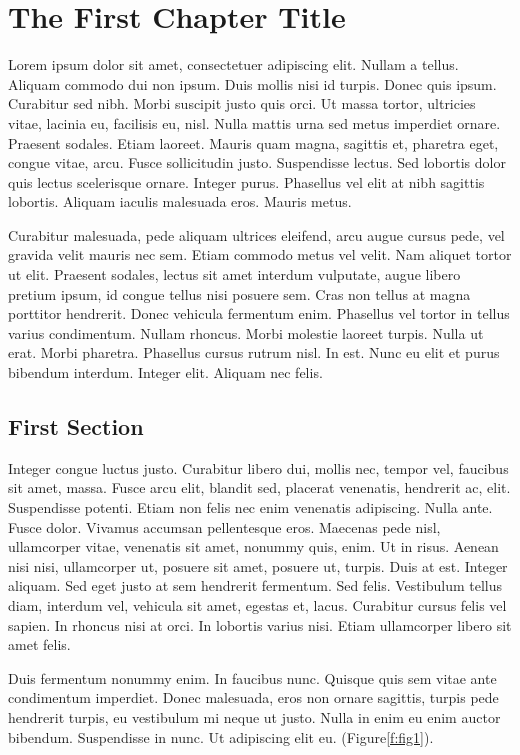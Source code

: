 \chapter{The First Chapter Title}
\label{c:chapter1} Lorem ipsum dolor sit amet, consectetuer adipiscing elit.
Nullam a tellus. Aliquam commodo dui non ipsum. Duis mollis nisi id turpis.
Donec quis ipsum. Curabitur sed nibh. Morbi suscipit justo quis orci. Ut massa
tortor, ultricies vitae, lacinia eu, facilisis eu, nisl. Nulla mattis urna sed
metus imperdiet ornare. Praesent sodales. Etiam laoreet. Mauris quam magna,
sagittis et, pharetra eget, congue vitae, arcu. Fusce sollicitudin justo.
Suspendisse lectus. Sed lobortis dolor quis lectus scelerisque ornare. Integer
purus. Phasellus vel elit at nibh sagittis lobortis. Aliquam iaculis malesuada
eros. Mauris metus.

Curabitur malesuada, pede aliquam ultrices eleifend, arcu augue cursus pede,
vel gravida velit mauris nec sem. Etiam commodo metus vel velit. Nam aliquet
tortor ut elit. Praesent sodales, lectus sit amet interdum vulputate, augue
libero pretium ipsum, id congue tellus nisi posuere sem. Cras non tellus at
magna porttitor hendrerit. Donec vehicula fermentum enim. Phasellus vel tortor
in tellus varius condimentum. Nullam rhoncus. Morbi molestie laoreet turpis.
Nulla ut erat. Morbi pharetra. Phasellus cursus rutrum nisl. In est. Nunc eu
elit et purus bibendum interdum. Integer elit. Aliquam nec felis.

\section{First Section}
\label{st:section1} Integer congue luctus justo. Curabitur libero dui,
mollis nec, tempor vel, faucibus sit amet, massa. Fusce arcu elit, blandit sed,
placerat venenatis, hendrerit ac, elit. Suspendisse potenti. Etiam non felis
nec enim venenatis adipiscing. Nulla ante. Fusce dolor. Vivamus accumsan
pellentesque eros. Maecenas pede nisl, ullamcorper vitae, venenatis sit amet,
nonummy quis, enim. Ut in risus. Aenean nisi nisi, ullamcorper ut, posuere sit
amet, posuere ut, turpis. Duis at est. Integer aliquam. Sed eget justo at sem
hendrerit fermentum. Sed felis. Vestibulum tellus diam, interdum vel, vehicula
sit amet, egestas et, lacus. Curabitur cursus felis vel sapien. In rhoncus nisi
at orci. In lobortis varius nisi. Etiam ullamcorper libero sit amet felis.

Duis fermentum nonummy enim. In faucibus nunc. Quisque quis sem vitae ante
condimentum imperdiet. Donec malesuada, eros non ornare sagittis, turpis pede
hendrerit turpis, eu vestibulum mi neque ut justo. Nulla in enim eu enim auctor
bibendum. Suspendisse in nunc. Ut adipiscing elit eu. (Figure\ref{f:fig1}).

